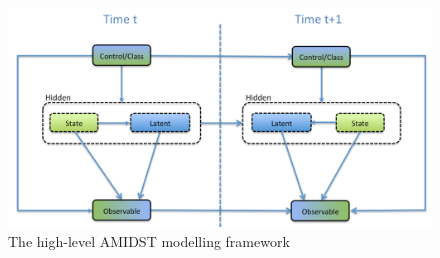 \begin{figure}[ht!]
\begin{center}
\includegraphics[scale=0.4]{./figures/AMIDSTModelClassGeneral}
\caption{\label{Figure:AMIDSTModelClassHighLevel} The high-level AMIDST modelling framework}
\end{center}
\end{figure}



